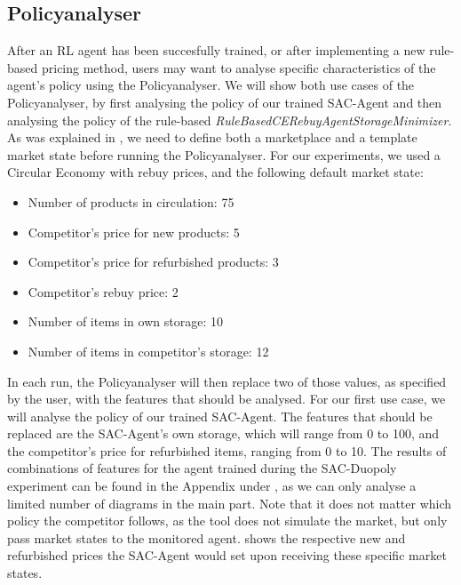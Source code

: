 \subsection{Policyanalyser}\label{subsec:ResultsPolicyanalyser}

After an RL agent has been succesfully trained, or after implementing a new rule-based pricing method, users may want to analyse specific characteristics of the agent's policy using the Policyanalyser. We will show both use cases of the Policyanalyser, by first analysing the policy of our trained SAC-Agent and then analysing the policy of the rule-based \emph{RuleBasedCERebuyAgentStorageMinimizer}. As was explained in , we need to define both a marketplace and a template market state before running the Policyanalyser. For our experiments, we used a Circular Economy with rebuy prices, and the following default market state:

\begin{itemize}
	\setlength\itemsep{0em}
	\item Number of products in circulation: 75
	\item Competitor's price for new products: 5
	\item Competitor's price for refurbished products: 3
	\item Competitor's rebuy price: 2
	\item Number of items in own storage: 10
	\item Number of items in competitor's storage: 12
\end{itemize}
In each run, the Policyanalyser will then replace two of those values, as specified by the user, with the features that should be analysed. For our first use case, we will analyse the policy of our trained SAC-Agent. The features that should be replaced are the SAC-Agent's own storage, which will range from 0 to 100, and the competitor's price for refurbished items, ranging from 0 to 10. The results of combinations of features for the agent trained during the SAC-Duopoly experiment can be found in the Appendix under , as we can only analyse a limited number of diagrams in the main part. Note that it does not matter which policy the competitor follows, as the tool does not simulate the market, but only pass market states to the monitored agent.  shows the respective new and refurbished prices the SAC-Agent would set upon receiving these specific market states.

